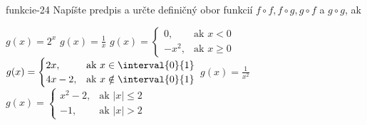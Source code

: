 \begin{defproblem}{funkcie-24}
Napíšte predpis a určte definičný obor funkcií $f \circ f,f \circ g,g \circ f$
a $g \circ g$, ak
\begin{tasks}
  \task
    $g(x) = 2^x$
  \task
    $g(x)=\frac{1}{x}$
  \task
    $g(x) =
      \begin{cases}
        0,    & \text{ak }  x < 0 \\
        -x^2, & \text{ak }  x \geq 0
      \end{cases}
    $
  \task
    $g(x) =
      \begin{cases}
        2x,     & \text{ak }  x \in \interval{0}{1} \\
        4x - 2, & \text{ak }  x \notin \interval{0}{1}
      \end{cases}
    $
  \task
    $g(x) = \frac{1}{x^2}$
  \task
    $g(x) =
      \begin{cases}
        x^2 - 2, & \text{ak }  |x| \leq 2 \\
        -1,      & \text{ak }  |x| > 2
      \end{cases}$
\end{tasks}
\end{defproblem}

